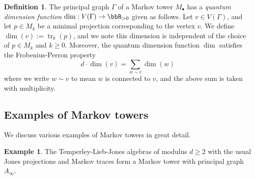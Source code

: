 \documentclass[11pt]{article}
\theoremstyle{plain}
\theoremstyle{definition}
\newtheorem{defn}[thm]{Definition}
\newtheorem{ex}[thm]{Example}
\DeclareMathOperator{\tr}{tr}
\begin{document}
\begin{defn}
The principal graph $\Gamma$ of a Markov tower $M_\bullet$ has a \emph{quantum dimension function} $\dim : V(\Gamma) \to \bbR_{>0}$ given as follows.
Let $v \in V(\Gamma)$, and let $p\in M_k$ be a minimal projection corresponding to the vertex $v$.
We define $\dim(v) := \tr_k(p)$, and we note this dimension is independent of the choice of $p \in M_k$ and $k\geq 0$.
Moreover, the quantum dimension function $\dim$ satisfies the Frobenius-Perron property
\begin{equation}
\label{eq:QuantumDimension}
d\cdot \dim(v) 
=
\sum_{w\sim v}
\dim(w)
\end{equation}
where we write $w\sim v$ to mean $w$ is connected to $v$, and the above sum is taken with multiplicity.
\end{defn}

\subsection{Examples of Markov towers}

We discuss various examples of Markov towers in great detail.

\begin{ex}
The Temperley-Lieb-Jones algebras of modulus $d\geq 2$ with the usual Jones projections and Markov traces form a Markov tower with principal graph $A_{\infty}$.
\end{ex}
\end{document}
